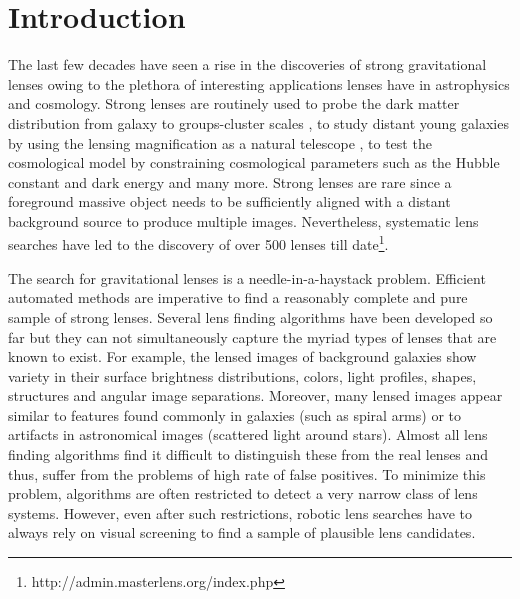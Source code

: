 \documentclass[useAMS,usenatbib,a4paper]{mn2e}
\begin{document}
\setcounter{footnote}{1}


\section{Introduction}
\label{sec:intro}

The last few decades have seen a rise in the discoveries of strong
gravitational lenses owing to the plethora of interesting applications
lenses have in astrophysics and cosmology. Strong lenses are routinely
used to probe the dark matter distribution from galaxy
\citep[e.g.][]{Koopmans2006,Barnabe2009,Sonnenfeld2015} to groups-cluster
scales
\citep[e.g.][]{Limousin2008,Zitrin2011,Oguri2012,More2012,Newman2013}, to
study distant young galaxies by using the lensing magnification as a
natural telescope \citep[e.g.][]{Zitrin2009,Zheng2012,Whitaker2014}, to
test the cosmological model by constraining cosmological parameters such
as the Hubble constant and dark energy
\citep[e.g.][]{Suyu2010,Collett2012,Collett2014,Sereno2014} and many more. Strong
lenses are rare since a foreground massive object needs to be
sufficiently aligned with a distant background source to produce
multiple images. Nevertheless, systematic lens searches have led to the
discovery of over 500 lenses till
date\footnote{http://admin.masterlens.org/index.php}.

The search for gravitational lenses is a needle-in-a-haystack problem.
Efficient automated methods are imperative to find a reasonably complete
and pure sample of strong lenses. Several lens finding algorithms have
been developed so far 
\citep[e.g.][]{Lenzen2004,Alard2006,Seidel2007,More2012,Gavazzi2014} but they can not
simultaneously capture the myriad types of lenses that are known to
exist. For example, the lensed images of background galaxies show
variety in their surface brightness distributions, colors, light
profiles, shapes, structures and angular image separations.  Moreover,
many lensed images appear similar to features found commonly in galaxies
(such as spiral arms) or to artifacts in astronomical images (scattered
light around stars).  Almost all lens finding algorithms find it
difficult to distinguish these from the real lenses and thus, suffer
from the problems of high rate of false positives.  To minimize this problem,
algorithms are often restricted to detect a very narrow class of lens
systems. However, even after such restrictions, robotic lens searches
have to always rely on visual screening to find a sample of plausible
lens candidates.
\end{document}
